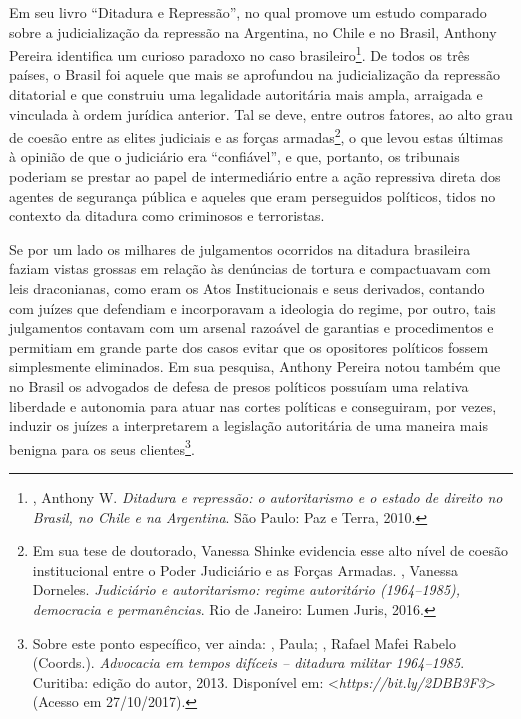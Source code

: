 Em seu livro ``Ditadura e Repressão'', no qual promove um estudo
comparado sobre a judicialização da repressão na Argentina, no Chile e
no Brasil, Anthony Pereira identifica um curioso paradoxo no caso
brasileiro\footnote{, Anthony W. \emph{Ditadura e repressão: o
  autoritarismo e o estado de direito no Brasil, no Chile e na
  Argentina}. São Paulo: Paz e Terra, 2010.}. De todos os três países, o
Brasil foi aquele que mais se aprofundou na judicialização da repressão
ditatorial e que construiu uma legalidade autoritária mais ampla,
arraigada e vinculada à ordem jurídica anterior. Tal se deve, entre
outros fatores, ao alto grau de coesão entre as elites judiciais e as
forças armadas\footnote{Em sua tese de doutorado, Vanessa Shinke
  evidencia esse alto nível de coesão institucional entre o Poder
  Judiciário e as Forças Armadas. , Vanessa Dorneles.
  \emph{Judiciário e autoritarismo: regime autoritário (1964--1985),
  democracia e permanências}. Rio de Janeiro: Lumen Juris, 2016.}, o que
levou estas últimas à opinião de que o judiciário era ``confiável'', e
que, portanto, os tribunais poderiam se prestar ao papel de intermediário
entre a ação repressiva direta dos agentes de segurança pública e
aqueles que eram perseguidos políticos, tidos no contexto da ditadura
como criminosos e terroristas.

Se por um lado os milhares de julgamentos ocorridos na ditadura
brasileira faziam vistas grossas em relação às denúncias de tortura e
compactuavam com leis draconianas, como eram os Atos Institucionais e
seus derivados, contando com juízes que defendiam e incorporavam a
ideologia do regime, por outro, tais julgamentos contavam com um arsenal
razoável de garantias e procedimentos e permitiam em grande parte dos
casos evitar que os opositores políticos fossem simplesmente eliminados.
Em sua pesquisa, Anthony Pereira notou também que no Brasil os advogados
de defesa de presos políticos possuíam uma relativa liberdade e
autonomia para atuar nas cortes políticas e conseguiram, por vezes,
induzir os juízes a interpretarem a legislação autoritária de uma
maneira mais benigna para os seus clientes\footnote{Sobre este ponto
  específico, ver ainda: , Paula; , Rafael Mafei Rabelo
  (Coords.). \emph{Advocacia em tempos difíceis -- ditadura militar
  1964--1985}. Curitiba: edição do autor, 2013. Disponível em:
 \textless{}\emph{https://bit.ly/2DBB3F3}\textgreater{}
  (Acesso em 27/10/2017).}.

